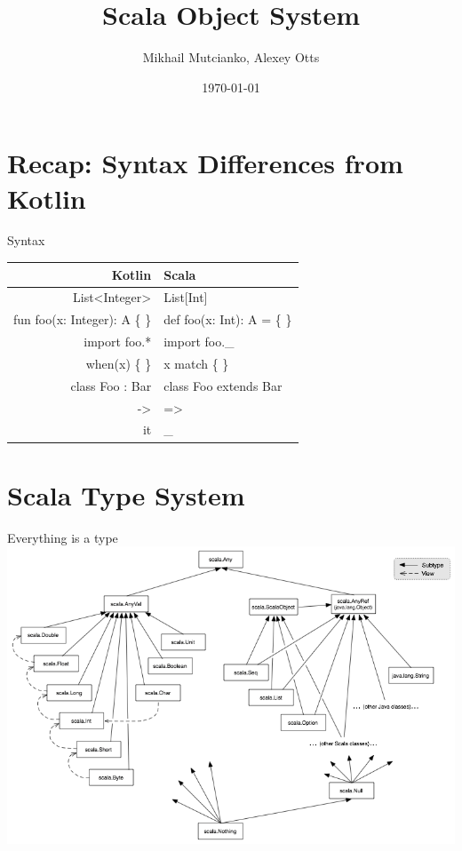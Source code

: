 \documentclass[aspectratio=169]{beamer}
\title{Scala Object System}
\author{Mikhail Mutcianko, Alexey Otts}
\institute{СПБгУ, СП}
\date{\today}
\begin{document}
\frame{\titlepage}

\section{Recap: Syntax Differences from Kotlin}

\begin{frame}{Syntax}
  \centering
  \begin{tabular}{>{\ttfamily}r@{\ $\Leftrightarrow$\ }>{\ttfamily}l}
    Kotlin & Scala \\
    \hline
    \pause
    List<Integer> & List[Int] \\
    \pause
    fun foo(x: Integer): A \{ \} & def foo(x: Int): A = \{  \} \\
    \pause
    import foo.* & import foo.\_ \\
    \pause
    when(x) \{  \} & x match \{  \} \\
    \pause
    class Foo : Bar & class Foo extends Bar \\
    \pause
    -> & => \\
    \pause
    it & \_
  \end{tabular}
\end{frame}

\section{Scala Type System}

\begin{frame}{Everything is a type}
  \centering
  \includegraphics[scale=0.35]{classhierarchy.png}
\end{frame}
\end{document}
